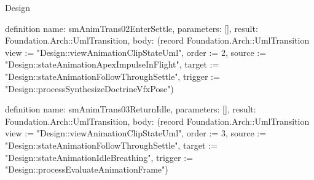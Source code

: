 \begin{lexlean}{Design}
\begin{semanticmodule}
definition{
  name: smAnimTrans02EnterSettle,
  parameters: [],
  result: Foundation.Arch::UmlTransition,
  body: (record Foundation.Arch::UmlTransition {view := "Design::viewAnimationClipStateUml", order := 2, source := "Design::stateAnimationApexImpulseInFlight", target := "Design::stateAnimationFollowThroughSettle", trigger := "Design::processSynthesizeDoctrineVfxPose"})
}

definition{
  name: smAnimTrans03ReturnIdle,
  parameters: [],
  result: Foundation.Arch::UmlTransition,
  body: (record Foundation.Arch::UmlTransition {view := "Design::viewAnimationClipStateUml", order := 3, source := "Design::stateAnimationFollowThroughSettle", target := "Design::stateAnimationIdleBreathing", trigger := "Design::processEvaluateAnimationFrame"})
}
\end{semanticmodule}
\end{lexlean}
